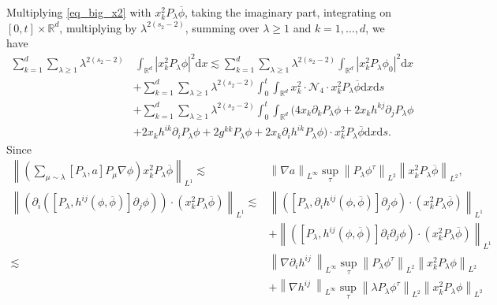 \documentclass[10pt,twoside,a4paper]{article}
\numberwithin{equation}{section}\allowdisplaybreaks
\def\geq{\geqslant}
\begin{document}
	Multiplying \eqref{eq_big_x2} with $x^2_k P_{\lambda} \overline{ \phi }   $, taking the imaginary part, integrating on $ [0,t]\times \mathbb{R}^d $, multiplying by $ \lambda^{2(s_2-2)} $, summing over $ \lambda\geq 1 $ and $k=1,\dots, d$, we have
	\begin{align}
		\sum_{k=1}^d\sum_{\lambda\geq 1} \lambda^{2(s_2-2)}&\, \int_{\mathbb{R}^{d}} \left| x_k^2P_{\lambda}\phi\right|^2 \mathrm{d} x  \lesssim   \sum_{k=1}^d\sum_{\lambda\geq 1} \lambda^{2(s_2-2)} \int_{\mathbb{R}^{d}} \left| x_k^2P_{\lambda}\phi_0\right|^2 \mathrm{d} x  \nonumber\\
		&+\sum_{k=1}^d\sum_{\lambda\geq 1} \lambda^{2(s_2-2)} \int_0^t \int_{\mathbb{R}^{d}} x^2_k \cdot\mathcal{N}_4 \cdot x^2_k P_{\lambda} \overline{ \phi }  \mathrm{d} x \mathrm{d} s \label{B_we_est_t1}\\
		&+\sum_{k=1}^d\sum_{\lambda\geq 1} \lambda^{2(s_2-2)} \int_0^t \int_{\mathbb{R}^{d}}  (4 x_k \partial_k  P_{\lambda}\phi +2 x_k h^{kj}  \partial_j P_{\lambda}\phi\nonumber\\
		&+2 x_k h^{ik} \partial_i P_{\lambda}\phi +2 g^{kk}P_{\lambda}\phi +2 x_k \partial_i h^{ik}P_{\lambda}\phi)\cdot x^2_k P_{\lambda} \overline{ \phi }  \mathrm{d} x \mathrm{d} s. \label{B_we_est_t2}
	\end{align}
	Since
	\begin{align*}
		\left\|( \sum_{\mu\sim \lambda} [  P_{\lambda},a  ]  P_\mu \nabla \phi) x^2_k P_{\lambda} \overline{ \phi } \right\|_{L^1} \lesssim & \left\|\nabla a\right\|_{L^\infty} \sup_\tau\left\| P_\lambda \phi^{\tau}\right\|_{L^2}  \left\|x^2_k P_{\lambda} \overline{ \phi }  \right\|_{L^2},\\
		\left\|(\partial_i\left(\left[P_{\lambda}, h^{ij}\left(\phi,\overline{\phi}\right) \right]  \partial_j  \phi \right)) \cdot (x^2_k P_{\lambda} \overline{ \phi } )\right\|_{L^1} \lesssim &   \left\|\left(\left[P_{\lambda}, \partial_ih^{ij}\left(\phi,\overline{\phi}\right) \right]  \partial_j  \phi \right) \cdot (x^2_k P_{\lambda} \overline{ \phi } )\right\|_{L^1}\\
		&+  \left\|\left(\left[P_{\lambda}, h^{ij}\left(\phi,\overline{\phi}\right) \right] \partial_i \partial_j  \phi \right) \cdot (x^2_k P_{\lambda} \overline{ \phi } )\right\|_{L^1}\\
		\lesssim &  \left\|\nabla \partial_ih^{ij}\ \right\|_{L^\infty}  \sup_{\tau} \left\|P_{\lambda}  \phi^\tau \right\|_{L^2} \left\|x^2_k P_{\lambda} \phi \right\|_{L^2}\\
		&+\left\|\nabla  h^{ij}\ \right\|_{L^\infty}  \sup_{\tau} \left\| \lambda P_{\lambda}  \phi^\tau \right\|_{L^2} \left\|x^2_k P_{\lambda} \phi \right\|_{L^2}
	\end{align*}
\end{document}
